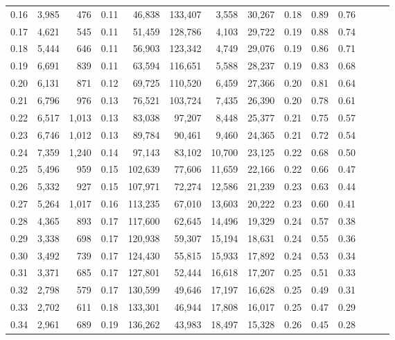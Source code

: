 \begin{tabular}{rrrrrrrrrrrrrr}
0.16 &  3,985 &    476 &  0.11 &   46,838 &  133,407 &   3,558 &  30,267 &  0.18 &  0.89 &      0.76 \\
0.17 &  4,621 &    545 &  0.11 &   51,459 &  128,786 &   4,103 &  29,722 &  0.19 &  0.88 &      0.74 \\
0.18 &  5,444 &    646 &  0.11 &   56,903 &  123,342 &   4,749 &  29,076 &  0.19 &  0.86 &      0.71 \\
0.19 &  6,691 &    839 &  0.11 &   63,594 &  116,651 &   5,588 &  28,237 &  0.19 &  0.83 &      0.68 \\
0.20 &  6,131 &    871 &  0.12 &   69,725 &  110,520 &   6,459 &  27,366 &  0.20 &  0.81 &      0.64 \\
0.21 &  6,796 &    976 &  0.13 &   76,521 &  103,724 &   7,435 &  26,390 &  0.20 &  0.78 &      0.61 \\
0.22 &  6,517 &  1,013 &  0.13 &   83,038 &   97,207 &   8,448 &  25,377 &  0.21 &  0.75 &      0.57 \\
0.23 &  6,746 &  1,012 &  0.13 &   89,784 &   90,461 &   9,460 &  24,365 &  0.21 &  0.72 &      0.54 \\
0.24 &  7,359 &  1,240 &  0.14 &   97,143 &   83,102 &  10,700 &  23,125 &  0.22 &  0.68 &      0.50 \\
0.25 &  5,496 &    959 &  0.15 &  102,639 &   77,606 &  11,659 &  22,166 &  0.22 &  0.66 &      0.47 \\
0.26 &  5,332 &    927 &  0.15 &  107,971 &   72,274 &  12,586 &  21,239 &  0.23 &  0.63 &      0.44 \\
0.27 &  5,264 &  1,017 &  0.16 &  113,235 &   67,010 &  13,603 &  20,222 &  0.23 &  0.60 &      0.41 \\
0.28 &  4,365 &    893 &  0.17 &  117,600 &   62,645 &  14,496 &  19,329 &  0.24 &  0.57 &      0.38 \\
0.29 &  3,338 &    698 &  0.17 &  120,938 &   59,307 &  15,194 &  18,631 &  0.24 &  0.55 &      0.36 \\
0.30 &  3,492 &    739 &  0.17 &  124,430 &   55,815 &  15,933 &  17,892 &  0.24 &  0.53 &      0.34 \\
0.31 &  3,371 &    685 &  0.17 &  127,801 &   52,444 &  16,618 &  17,207 &  0.25 &  0.51 &      0.33 \\
0.32 &  2,798 &    579 &  0.17 &  130,599 &   49,646 &  17,197 &  16,628 &  0.25 &  0.49 &      0.31 \\
0.33 &  2,702 &    611 &  0.18 &  133,301 &   46,944 &  17,808 &  16,017 &  0.25 &  0.47 &      0.29 \\
0.34 &  2,961 &    689 &  0.19 &  136,262 &   43,983 &  18,497 &  15,328 &  0.26 &  0.45 &      0.28 \\

\end{tabular}
